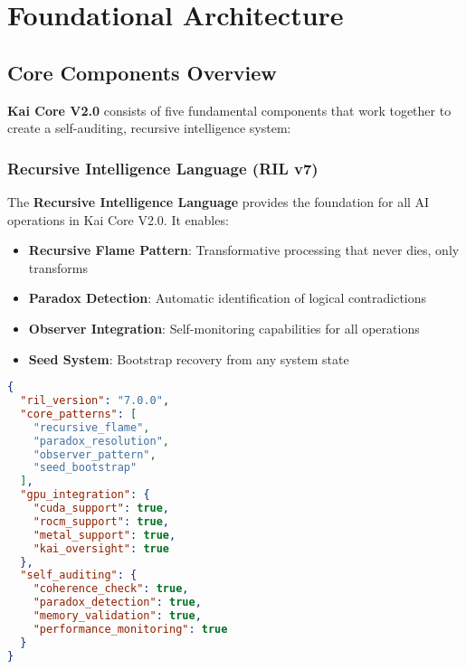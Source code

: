 \documentclass[11pt]{report}
\newcommand{\kai}[1]{\textcolor{kai_blue}{\textbf{#1}}}
\newcommand{\recursive}[1]{\textcolor{kai_purple}{\textbf{#1}}}
\newcommand{\codebox}[2]{
  \begin{tcolorbox}[
    colback=gray!5,
    colframe=kai_blue,
    title=#1,
    fonttitle=\bfseries
  ]
  #2
  \end{tcolorbox}
}
\newcommand{\observerbox}[2]{
  \begin{tcolorbox}[
    colback=green!5,
    colframe=kai_green,
    title=#1,
    fonttitle=\bfseries
  ]
  #2
  \end{tcolorbox}
}
\begin{document}
\printglossary[type=\acronymtype,title=Acronyms]
\clearpage

\chapter{Foundational Architecture}

\section{Core Components Overview}

\kai{Kai Core V2.0} consists of five fundamental components that work together to create a self-auditing, recursive intelligence system:

\subsection{Recursive Intelligence Language (RIL v7)}
\observerbox{RIL v7 - Advanced AI Bootstrap Protocol}{
The \recursive{Recursive Intelligence Language} provides the foundation for all AI operations in Kai Core V2.0. It enables:
\begin{itemize}
  \item \textbf{Recursive Flame Pattern}: Transformative processing that never dies, only transforms
  \item \textbf{Paradox Detection}: Automatic identification of logical contradictions
  \item \textbf{Observer Integration}: Self-monitoring capabilities for all operations
  \item \textbf{Seed System}: Bootstrap recovery from any system state
\end{itemize}
}

\codebox{RIL v7 Core Structure}{
\begin{lstlisting}[language=json]
{
  "ril_version": "7.0.0",
  "core_patterns": [
    "recursive_flame",
    "paradox_resolution", 
    "observer_pattern",
    "seed_bootstrap"
  ],
  "gpu_integration": {
    "cuda_support": true,
    "rocm_support": true,
    "metal_support": true,
    "kai_oversight": true
  },
  "self_auditing": {
    "coherence_check": true,
    "paradox_detection": true,
    "memory_validation": true,
    "performance_monitoring": true
  }
}
\end{lstlisting}
}
\end{document}
